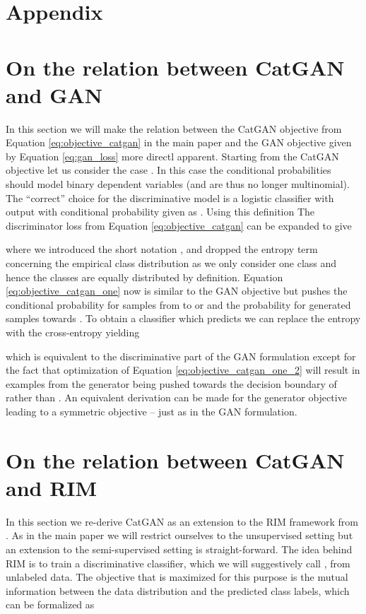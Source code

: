 \documentclass{article} \usepackage{iclr2016_conference,times}
\begin{document}



\section*{Appendix}
\begin{appendix}

\section{On the relation between CatGAN and GAN}
In this section we will make the relation between the CatGAN objective
from Equation \eqref{eq:objective_catgan} in the main paper and the
GAN objective given by Equation \eqref{eq:gan_loss} more directl
apparent.  Starting from the CatGAN objective let us consider the case
. In this case the conditional probabilities should model binary
dependent variables (and are thus no longer multinomial). The
``correct'' choice for the discriminative model is a logistic
classifier with output  with
conditional probability  given as
. Using this
definition The discriminator loss  from Equation
\eqref{eq:objective_catgan} can be expanded to give

where we introduced the short notation
,
 and dropped the entropy term
 concerning the empirical
class distribution as we only consider one class and hence the classes
are equally distributed by definition. Equation \eqref{eq:objective_catgan_one}
now is similar to the GAN objective but pushes the conditional
probability for samples from  to  or  and the
probability for generated samples towards . To obtain a
classifier which predicts  we can replace the
entropy  with the cross-entropy  yielding

which is equivalent to the discriminative part of the GAN formulation
except for the fact that optimization of Equation
\eqref{eq:objective_catgan_one_2} will result in examples from the
generator being pushed towards the decision boundary of
 rather than .  An
equivalent derivation can be made for the generator objective
 leading to a symmetric objective -- just as in the GAN
formulation.

\section{On the relation between CatGAN and RIM}
\label{sect:relation_catgan_rim}
In this section we re-derive CatGAN as an extension to the RIM
framework from \citet{Krause_2010}. As in the main paper we will
restrict ourselves to the unsupervised setting but an extension to the
semi-supervised setting is straight-forward. The idea behind RIM is to
train a discriminative classifier, which we will suggestively call
, from unlabeled data. The objective that is maximized for this
purpose is the mutual information between the data distribution and
the predicted class labels, which can be formalized as


\end{appendix}
\end{document}
